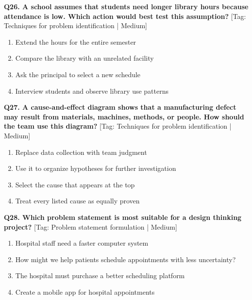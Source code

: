 \noindent\textbf{Q26. A school assumes that students need longer library hours because attendance is low. Which action would best test this assumption?} \hfill [Tag: Techniques for problem identification | Medium]
\begin{enumerate}[label=(\alph*),topsep=2pt,itemsep=1pt,partopsep=0pt,parsep=0pt]
    \item {Extend the hours for the entire semester}
    \item {Compare the library with an unrelated facility}
    \item {Ask the principal to select a new schedule}
    \item {Interview students and observe library use patterns}
\end{enumerate}
\vspace{2mm}

\noindent\textbf{Q27. A cause-and-effect diagram shows that a manufacturing defect may result from materials, machines, methods, or people. How should the team use this diagram?} \hfill [Tag: Techniques for problem identification | Medium]
\begin{enumerate}[label=(\alph*),topsep=2pt,itemsep=1pt,partopsep=0pt,parsep=0pt]
    \item {Replace data collection with team judgment}
    \item {Use it to organize hypotheses for further investigation}
    \item {Select the cause that appears at the top}
    \item {Treat every listed cause as equally proven}
\end{enumerate}
\vspace{2mm}

\noindent\textbf{Q28. Which problem statement is most suitable for a design thinking project?} \hfill [Tag: Problem statement formulation | Medium]
\begin{enumerate}[label=(\alph*),topsep=2pt,itemsep=1pt,partopsep=0pt,parsep=0pt]
    \item {Hospital staff need a faster computer system}
    \item {How might we help patients schedule appointments with less uncertainty?}
    \item {The hospital must purchase a better scheduling platform}
    \item {Create a mobile app for hospital appointments}
\end{enumerate}
\vspace{2mm}

